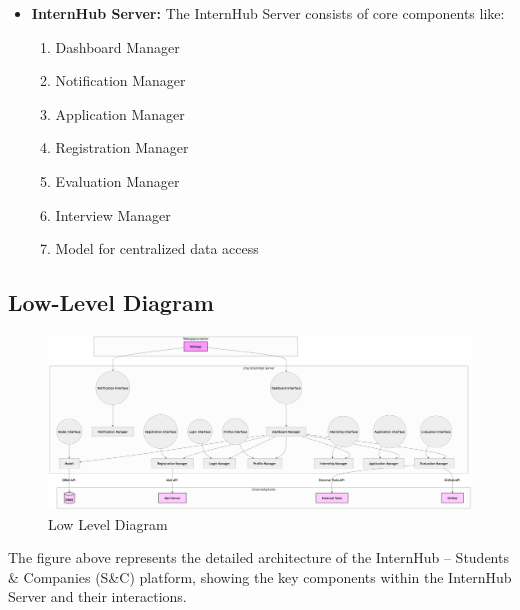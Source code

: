 \begin{itemize}
    \item \textbf{InternHub Server:}
    The InternHub Server consists of core components like:
\begin{enumerate}
    \item Dashboard Manager
    \item Notification Manager
    \item Application Manager
    \item Registration Manager
    \item Evaluation Manager
    \item Interview Manager
    \item Model for centralized data access
\end{enumerate}
    
\end{itemize}

\subsection{Low-Level Diagram}
\label{subsubsec:low_level_diagram}

\begin{figure}[H]
    \begin{center}
        \includegraphics[width=0.82\linewidth]{JhaBhatiaSharma/imagesDD/LowLevelDiagram.png}
        \caption{Low Level Diagram}
        \label{fig:lowleveldiagram}%
    \end{center}
\end{figure}

The figure above represents the detailed architecture of the InternHub – Students \& Companies (S\&C) platform, showing the key components within the InternHub Server and their interactions.

